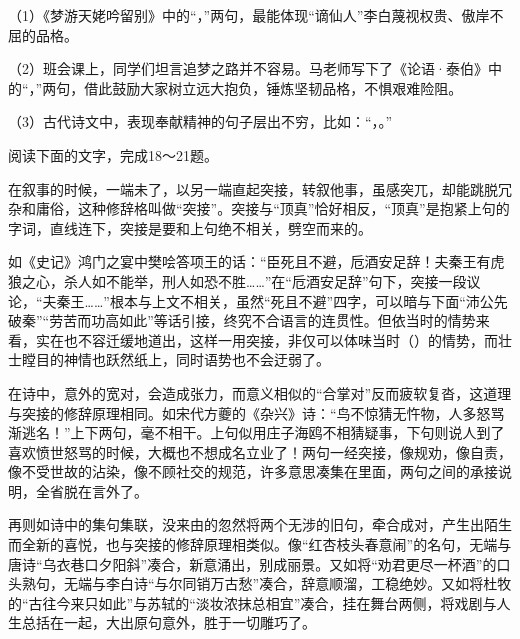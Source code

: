 \documentclass[11pt,a4paper]{ctexart}
\begin{document}

\par\vspace{2.2em}


（1）《梦游天姥吟留别》中的“\blank[6.5em]，\blank[6.5em]”两句，最能体现“谪仙人”李白蔑视权贵、傲岸不屈的品格。

（2）班会课上，同学们坦言追梦之路并不容易。马老师写下了《论语·泰伯》中的“\blank[6.5em]，\blank[6.5em]”两句，借此鼓励大家树立远大抱负，锤炼坚韧品格，不惧艰难险阻。

（3）古代诗文中，表现奉献精神的句子层出不穷，比如：“\blank[6.5em]，\blank[6.5em]。”

阅读下面的文字，完成18～21题。

{\ywkai 在叙事的时候，一端未了，以另一端直起突接，转叙他事，虽感突兀，却能跳脱冗杂和庸俗，这种修辞格叫做“突接”。突接与“顶真”恰好相反，“顶真”是抱紧上句的字词，直线连下，突接是要和上句绝不相关，劈空而来的。

如《史记》鸿门之宴中樊哙答项王的话：“臣死且不避，卮酒安足辞！夫秦王有虎狼之心，杀人如不能举，刑人如恐不胜……”在“卮酒安足辞”句下，突接一段议论，“夫秦王……”根本与上文不相关，虽然“死且不避”四字，可以暗与下面“沛公先破秦”“劳苦而功高如此”等话引接，终究不合语言的连贯性。但依当时的情势来看，实在也不容迁缓地道出，这样一用突接，非仅可以体味当时（\blank[3em]）的情势，而壮士瞠目的神情也跃然纸上，同时语势也不会迂弱了。

在诗中，意外的宽对，会造成张力，而意义相似的“合掌对”反而疲软复沓，这道理与突接的修辞原理相同。如宋代方夔的《杂兴》诗：“鸟不惊猜无忤物，人多怒骂渐逃名！”上下两句，毫不相干。上句似用庄子海鸥不相猜疑事，下句则说人到了喜欢愤世怒骂的时候，大概也不想成名立业了！两句一经突接，像规劝，像自责，像不受世故的沾染，像不顾社交的规范，许多意思凑集在里面，两句之间的承接说明，全省脱在言外了。

再则如诗中的集句集联，没来由的忽然将两个无涉的旧句，牵合成对，产生出陌生而全新的喜悦，也与突接的修辞原理相类似。像“红杏枝头春意闹”的名句，无端与唐诗“乌衣巷口夕阳斜”凑合，新意涌出，别成丽景。又如将“劝君更尽一杯酒”的口头熟句，无端与李白诗“与尔同销万古愁”凑合，辞意顺溜，工稳绝妙。又如将杜牧的“古往今来只如此”与苏轼的“淡妆浓抹总相宜”凑合，挂在舞台两侧，将戏剧与人生总括在一起，大出原句意外，胜于一切雕巧了。\par}
\end{document}
